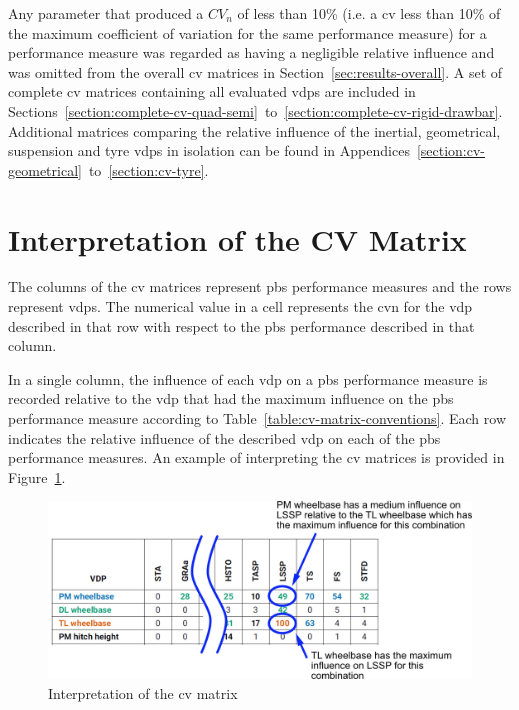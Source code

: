Any parameter that produced a $CV_n$ of less than 10\% (i.e. a \gls{cv} less than 10\% of the maximum coefficient of variation for the same performance measure) for a performance measure was regarded as having a negligible relative influence and was omitted from the overall \gls{cv} matrices in Section~\ref{sec:results-overall}. A set of complete \gls{cv} matrices containing all evaluated \glspl{vdp} are included in Sections~\ref{section:complete-cv-quad-semi}~to~\ref{section:complete-cv-rigid-drawbar}. Additional matrices comparing the relative influence of the inertial, geometrical, suspension and tyre \glspl{vdp} in isolation can be found in Appendices~\ref{section:cv-geometrical}~to~\ref{section:cv-tyre}.

\section{Interpretation of the CV Matrix}\label{section:interpretation-of-the-results-matrix}

The columns of the \gls{cv} matrices represent \gls{pbs} performance measures and the rows represent \glspl{vdp}. The numerical value in a cell represents the \gls{cvn} for the \gls{vdp} described in that row with respect to the \gls{pbs} performance described in that column.

In a single column, the influence of each \gls{vdp} on a \gls{pbs} performance measure is recorded relative to the \gls{vdp} that had the maximum influence on the \gls{pbs} performance measure according to Table~\ref{table:cv-matrix-conventions}. Each row indicates the relative influence of the described \gls{vdp} on each of the \gls{pbs} performance measures. An example of interpreting the \gls{cv} matrices is provided in Figure~\ref{figure:interpretation-of-cv-matrix}.

    \begin{figure}[H]
        \centering
        \includegraphics[width=1\textwidth]{fig/interpretation-of-cv-matrix}
        \caption{Interpretation of the \gls{cv} matrix}
        \label{figure:interpretation-of-cv-matrix}
    \end{figure}

